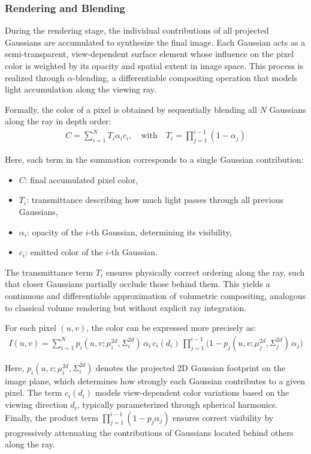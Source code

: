 \subsubsection{Rendering and Blending}

During the rendering stage, the individual contributions of all projected Gaussians are accumulated to synthesize the final image. 
Each Gaussian acts as a semi-transparent, view-dependent surface element whose influence on the pixel color is weighted by its opacity and spatial extent in image space. 
This process is realized through \(\alpha\)-blending, a differentiable compositing operation that models light accumulation along the viewing ray.

Formally, the color of a pixel is obtained by sequentially blending all \(N\) Gaussians along the ray in depth order:
\begin{align}
C = \sum_{i=1}^N T_i \alpha_i c_i, \quad \text{with} \quad T_i = \prod_{j=1}^{i-1} (1-\alpha_j)
\end{align}

Here, each term in the summation corresponds to a single Gaussian contribution:
\begin{itemize}
    \item \(C\): final accumulated pixel color,
    \item \(T_i\): transmittance describing how much light passes through all previous Gaussians,
    \item \(\alpha_i\): opacity of the \(i\)-th Gaussian, determining its visibility,
    \item \(c_i\): emitted color of the \(i\)-th Gaussian.
\end{itemize}

The transmittance term \(T_i\) ensures physically correct ordering along the ray, such that closer Gaussians partially occlude those behind them. 
This yields a continuous and differentiable approximation of volumetric compositing, analogous to classical volume rendering but without explicit ray integration.

For each pixel \((u, v)\), the color can be expressed more precisely as:
\begin{align}
I(u, v) = \sum_{i=1}^{N} p_i(u, v; \mu_i^{2d}, \Sigma_i^{2d}) \, \alpha_i \, c_i(d_i) \,
\prod_{j=1}^{i-1} \big(1 - p_j(u, v; \mu_j^{2d}, \Sigma_j^{2d}) \, \alpha_j \big)
\label{eq:projection_3D_gaussians} 
\end{align}

Here, \(p_i(u, v; \mu_i^{2d}, \Sigma_i^{2d})\) denotes the projected 2D Gaussian footprint on the image plane, which determines how strongly each Gaussian contributes to a given pixel.
The term \(c_i(d_i)\) models view-dependent color variations based on the viewing direction \(d_i\), typically parameterized through spherical harmonics. 
Finally, the product term \(\prod_{j=1}^{i-1} (1 - p_j \alpha_j)\) ensures correct visibility by progressively attenuating the contributions of Gaussians located behind others along the ray.


